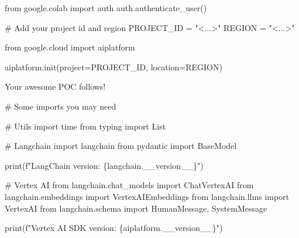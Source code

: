 \documentclass[
  letterpaper,
  DIV=11,
  numbers=noendperiod]{scrreprt}
\newenvironment{Shaded}{\begin{snugshade}}{\end{snugshade}}
\newcommand{\BuiltInTok}[1]{\textcolor[rgb]{0.00,0.23,0.31}{#1}}
\newcommand{\CommentTok}[1]{\textcolor[rgb]{0.37,0.37,0.37}{#1}}
\newcommand{\ImportTok}[1]{\textcolor[rgb]{0.00,0.46,0.62}{#1}}
\newcommand{\NormalTok}[1]{\textcolor[rgb]{0.00,0.23,0.31}{#1}}
\newcommand{\OperatorTok}[1]{\textcolor[rgb]{0.37,0.37,0.37}{#1}}
\newcommand{\SpecialCharTok}[1]{\textcolor[rgb]{0.37,0.37,0.37}{#1}}
\newcommand{\SpecialStringTok}[1]{\textcolor[rgb]{0.13,0.47,0.30}{#1}}
\newcommand{\StringTok}[1]{\textcolor[rgb]{0.13,0.47,0.30}{#1}}
\begin{document}
\begin{Shaded}
\begin{Highlighting}[]
\ImportTok{from}\NormalTok{ google.colab }\ImportTok{import}\NormalTok{ auth}
\NormalTok{auth.authenticate\_user()}
\end{Highlighting}
\end{Shaded}

\begin{Shaded}
\begin{Highlighting}[]
\CommentTok{\# Add your project id and region}
\NormalTok{PROJECT\_ID }\OperatorTok{=} \StringTok{"\textless{}...\textgreater{}"}
\NormalTok{REGION }\OperatorTok{=} \StringTok{"\textless{}...\textgreater{}"}

\ImportTok{from}\NormalTok{ google.cloud }\ImportTok{import}\NormalTok{ aiplatform}

\NormalTok{aiplatform.init(project}\OperatorTok{=}\NormalTok{PROJECT\_ID, location}\OperatorTok{=}\NormalTok{REGION)}
\end{Highlighting}
\end{Shaded}

Your awesome POC follows!

\begin{Shaded}
\begin{Highlighting}[]
\CommentTok{\# Some imports you may need}

\CommentTok{\# Utils}
\ImportTok{import}\NormalTok{ time}
\ImportTok{from}\NormalTok{ typing }\ImportTok{import}\NormalTok{ List}

\CommentTok{\# Langchain}
\ImportTok{import}\NormalTok{ langchain}
\ImportTok{from}\NormalTok{ pydantic }\ImportTok{import}\NormalTok{ BaseModel}

\BuiltInTok{print}\NormalTok{(}\SpecialStringTok{f"LangChain version: }\SpecialCharTok{\{}\NormalTok{langchain}\SpecialCharTok{.}\NormalTok{\_\_version\_\_}\SpecialCharTok{\}}\SpecialStringTok{"}\NormalTok{)}

\CommentTok{\# Vertex AI}
\ImportTok{from}\NormalTok{ langchain.chat\_models }\ImportTok{import}\NormalTok{ ChatVertexAI}
\ImportTok{from}\NormalTok{ langchain.embeddings }\ImportTok{import}\NormalTok{ VertexAIEmbeddings}
\ImportTok{from}\NormalTok{ langchain.llms }\ImportTok{import}\NormalTok{ VertexAI}
\ImportTok{from}\NormalTok{ langchain.schema }\ImportTok{import}\NormalTok{ HumanMessage, SystemMessage}

\BuiltInTok{print}\NormalTok{(}\SpecialStringTok{f"Vertex AI SDK version: }\SpecialCharTok{\{}\NormalTok{aiplatform}\SpecialCharTok{.}\NormalTok{\_\_version\_\_}\SpecialCharTok{\}}\SpecialStringTok{"}\NormalTok{)}
\end{Highlighting}
\end{Shaded}
\end{document}
